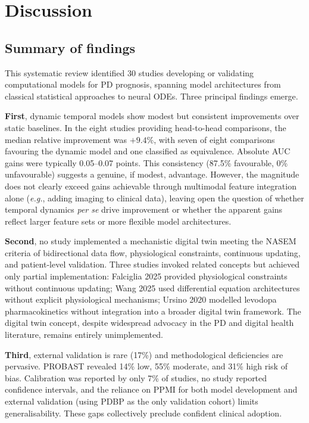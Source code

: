 \documentclass[11pt,a4paper]{article}
\newcommand{\eg}{\textit{e.g.}}
\begin{document}
\section{Discussion}

\subsection{Summary of findings}

This systematic review identified 30 studies developing or validating computational models for PD prognosis, spanning model architectures from classical statistical approaches to neural ODEs. Three principal findings emerge.

\textbf{First}, dynamic temporal models show modest but consistent improvements over static baselines. In the eight studies providing head-to-head comparisons, the median relative improvement was $+9.4\%$, with seven of eight comparisons favouring the dynamic model and one classified as equivalence. Absolute AUC gains were typically 0.05--0.07 points. This consistency (87.5\% favourable, 0\% unfavourable) suggests a genuine, if modest, advantage. However, the magnitude does not clearly exceed gains achievable through multimodal feature integration alone (\eg, adding imaging to clinical data), leaving open the question of whether temporal dynamics \emph{per se} drive improvement or whether the apparent gains reflect larger feature sets or more flexible model architectures.

\textbf{Second}, no study implemented a mechanistic digital twin meeting the NASEM criteria of bidirectional data flow, physiological constraints, continuous updating, and patient-level validation. Three studies invoked related concepts but achieved only partial implementation: Falciglia 2025 provided physiological constraints without continuous updating; Wang 2025 used differential equation architectures without explicit physiological mechanisms; Ursino 2020 modelled levodopa pharmacokinetics without integration into a broader digital twin framework. The digital twin concept, despite widespread advocacy in the PD and digital health literature, remains entirely unimplemented.

\textbf{Third}, external validation is rare (17\%) and methodological deficiencies are pervasive. PROBAST revealed 14\% low, 55\% moderate, and 31\% high risk of bias. Calibration was reported by only 7\% of studies, no study reported confidence intervals, and the reliance on PPMI for both model development and external validation (using PDBP as the only validation cohort) limits generalisability. These gaps collectively preclude confident clinical adoption.
\end{document}
